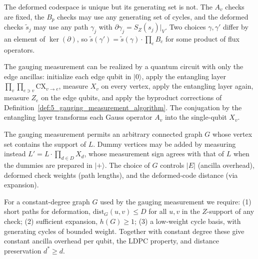 \begin{remark}
\label{rem:8_freedom_in_deformed_checks}
\leanok
The deformed codespace is unique but its generating set is not. The $A_v$ checks are fixed,
the $B_p$ checks may use any generating set of cycles, and the deformed checks
$\tilde{s}_j$ may use any path $\gamma_j$ with $\partial \gamma_j = S_Z(s_j)|_V$.
Two choices $\gamma, \gamma'$ differ by an element of $\ker(\partial)$, so
$\tilde s(\gamma') = \tilde s(\gamma) \cdot \prod_{c} B_c$ for some product of flux operators.
\end{remark}

\begin{remark}
\label{rem:9_circuit_implementation}
\leanok
The gauging measurement can be realized by a quantum circuit with only the edge ancillas:
initialize each edge qubit in $|0\rangle$, apply the entangling layer
$\prod_v \prod_{e \ni v} \mathrm{CX}_{v \to e}$, measure $X_v$ on every vertex, apply the
entangling layer again, measure $Z_e$ on the edge qubits, and apply the byproduct
corrections of Definition~\ref{def:5_gauging_measurement_algorithm}. The conjugation by the
entangling layer transforms each Gauss operator $A_v$ into the single-qubit $X_v$.
\end{remark}

\begin{remark}
\label{rem:10_flexibility_of_graph_g}
\leanok
The gauging measurement permits an arbitrary connected graph $G$ whose vertex set contains
the support of $L$. Dummy vertices may be added by measuring instead
$L' = L \cdot \prod_{d \in D} X_d$, whose measurement sign agrees with that of $L$ when the
dummies are prepared in $|+\rangle$. The choice of $G$ controls $|E|$ (ancilla overhead),
deformed check weights (path lengths), and the deformed-code distance (via expansion).
\end{remark}

\begin{remark}
\label{rem:11_desiderata_for_graph_g}
\leanok
For a constant-degree graph $G$ used by the gauging measurement we require:
(1) short paths for deformation, $\mathrm{dist}_G(u,v) \le D$ for all $u, v$ in the
$Z$-support of any check; (2) sufficient expansion, $h(G) \ge 1$; (3) a low-weight cycle
basis, with generating cycles of bounded weight. Together with constant degree these give
constant ancilla overhead per qubit, the LDPC property, and distance preservation $d^* \ge d$.
\end{remark}

